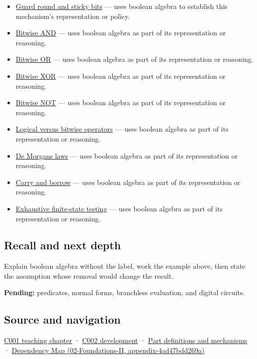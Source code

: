 \begin{itemize}
\item
  \hyperref[appendix-b572b631069b]{Guard round and sticky bits} --- uses boolean algebra to establish this mechanism's representation or policy.
\item
  \hyperref[appendix-68b52453737c]{Bitwise AND} --- uses boolean algebra as part of its representation or reasoning.
\item
  \hyperref[appendix-a427ce8ce8a6]{Bitwise OR} --- uses boolean algebra as part of its representation or reasoning.
\item
  \hyperref[appendix-d49161831368]{Bitwise XOR} --- uses boolean algebra as part of its representation or reasoning.
\item
  \hyperref[appendix-8f38927cfc54]{Bitwise NOT} --- uses boolean algebra as part of its representation or reasoning.
\item
  \hyperref[appendix-fe6b457d68d8]{Logical versus bitwise operators} --- uses boolean algebra as part of its representation or reasoning.
\item
  \hyperref[appendix-9079d3659da4]{De Morgan\textquotesingle s laws} --- uses boolean algebra as part of its representation or reasoning.
\item
  \hyperref[appendix-d52d5f78ffd1]{Carry and borrow} --- uses boolean algebra as part of its representation or reasoning.
\item
  \hyperref[appendix-05db24ccc28a]{Exhaustive finite-state testing} --- uses boolean algebra as part of its representation or reasoning.
\end{itemize}

\subsection{Recall and next depth}\label{recall-and-next-depth}

Explain boolean algebra without the label, work the example above, then state the assumption whose removal would change the result.

\textbf{Pending:} predicates, normal forms, branchless evaluation, and digital circuits.

\subsection{Source and navigation}\label{source-and-navigation}

\href{Continuous\%20Notes/Computing\%20Foundations\%20-\%20From\%20Bits\%20to\%20C++\%20and\%20Systems\%20APIs\#From\%20a\%20signal\%20to\%20an\%20interpretation}{C001 teaching chapter} · \href{Continuous\%20Notes/Computing\%20Foundations\%20-\%20From\%20Bits\%20to\%20C++\%20and\%20Systems\%20APIs\#Arithmetic\%20becomes\%20a\%20policy}{C002 development} · \hyperref[appendix-fd090d982a15]{Part definitions and mechanisms} · \href{}{Dependency Map (02-Foundations-II, appendix-4ad47bdd269a)}
